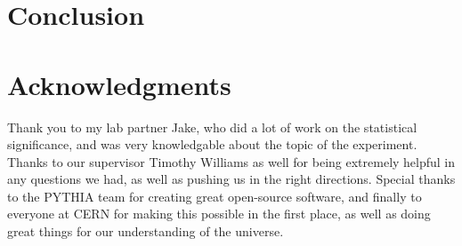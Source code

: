 \documentclass[11pt]{amsart}
\begin{document}
\begin{multicols}{2}
\section{Conclusion}

\section{Acknowledgments}

Thank you to my lab partner Jake, who did a lot of work on the statistical significance, and was very knowledgable about the topic of the experiment. Thanks to our supervisor Timothy Williams as well for being extremely helpful in any questions we had, as well as pushing us in the right directions. Special thanks to the PYTHIA team for creating great open-source software, and finally to everyone at CERN for making this possible in the first place, as well as doing great things for our understanding of the universe.


\end{multicols}



\end{document}
